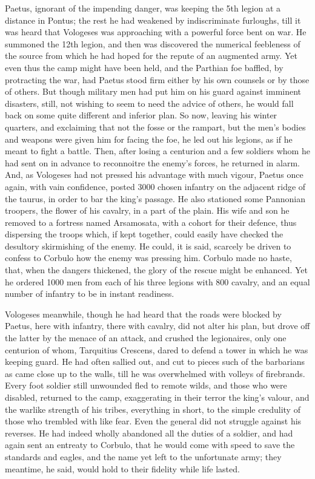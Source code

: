 Paetus, ignorant of the impending danger, was keeping the 5th legion at a distance in Pontus; the rest he had weakened by indiscriminate furloughs, till it was heard that Vologeses was approaching with a powerful force bent on war. He summoned the 12th legion, and then was discovered the numerical feebleness of the source from which he had hoped for the repute of an augmented army. Yet even thus the camp might have been held, and the Parthian foe baffled, by protracting the war, had Paetus stood firm either by his own counsels or by those of others. But though military men had put him on his guard against imminent disasters, still, not wishing to seem to need the advice of others, he would fall back on some quite different and inferior plan. So now, leaving his winter quarters, and exclaiming that not the fosse or the rampart, but the men's bodies and weapons were given him for facing the foe, he led out his legions, as if he meant to fight a battle. Then, after losing a centurion and a few soldiers whom he had sent on in advance to reconnoitre the enemy's forces, he returned in alarm. And, as Vologeses had not pressed his advantage with much vigour, Paetus once again, with vain confidence, posted 3000 chosen infantry on the adjacent ridge of the taurus, in order to bar the king's passage. He also stationed some Pannonian troopers, the flower of his cavalry, in a part of the plain. His wife and son he removed to a fortress named Arsamosata, with a cohort for their defence, thus dispersing the troops which, if kept together, could easily have checked the desultory skirmishing of the enemy. He could, it is said, scarcely be driven to confess to Corbulo how the enemy was pressing him. Corbulo made no haste, that, when the dangers thickened, the glory of the rescue might be enhanced. Yet he ordered 1000 men from each of his three legions with 800 cavalry, and an equal number of infantry to be in instant readiness.


Vologeses meanwhile, though he had heard that the roads were blocked by Paetus, here with infantry, there with cavalry, did not alter his plan, but drove off the latter by the menace of an attack, and crushed the legionaires, only one centurion of whom, Tarquitius Crescens, dared to defend a tower in which he was keeping guard. He had often sallied out, and cut to pieces such of the barbarians as came close up to the walls, till he was overwhelmed with volleys of firebrands. Every foot soldier still unwounded fled to remote wilds, and those who were disabled, returned to the camp, exaggerating in their terror the king's valour, and the warlike strength of his tribes, everything in short, to the simple credulity of those who trembled with like fear. Even the general did not struggle against his reverses. He had indeed wholly abandoned all the duties of a soldier, and had again sent an entreaty to Corbulo, that he would come with speed to save the standards and eagles, and the name yet left to the unfortunate army; they meantime, he said, would hold to their fidelity while life lasted.


